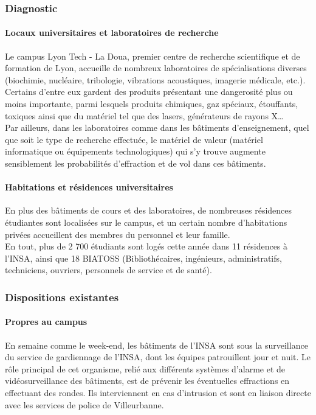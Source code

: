 \documentclass[hidelinks, paper=a4, fontsize=13pt]{report}
\begin{document}
\subsubsection{Diagnostic}
\paragraph{Locaux universitaires et laboratoires de recherche}
Le campus Lyon Tech - La Doua, premier centre de recherche scientifique et de formation de Lyon, accueille de nombreux laboratoires de spécialisations diverses (biochimie, nucléaire, tribologie, vibrations acoustiques, imagerie médicale, etc.). Certains d’entre eux gardent des produits présentant une dangerosité plus ou moins importante, parmi lesquels produits chimiques, gaz spéciaux, étouffants, toxiques ainsi que du matériel tel que des lasers, générateurs de rayons X…\\

Par ailleurs, dans les laboratoires comme dans les bâtiments d’enseignement, quel que soit le type de recherche effectuée, le matériel de valeur (matériel informatique ou équipements technologiques) qui s'y trouve augmente sensiblement les probabilités d’effraction et de vol dans ces bâtiments. 

\paragraph{Habitations et résidences universitaires}
En plus des bâtiments de cours et des laboratoires, de nombreuses résidences étudiantes sont localisées sur le campus, et un certain nombre d’habitations privées accueillent des membres du personnel et leur famille.\\
En tout, plus de 2 700 étudiants sont logés cette année dans 11 résidences à l’INSA, ainsi que 18 BIATOSS (Bibliothécaires, ingénieurs, administratifs, techniciens, ouvriers, personnels de service et de santé).

\subsubsection{Dispositions existantes}
\paragraph{Propres au campus}
En semaine comme le week-end, les bâtiments de l’INSA sont sous la surveillance du service de gardiennage de l’INSA, dont les équipes patrouillent jour et nuit. Le rôle principal de cet organisme, relié aux différents systèmes d’alarme et de vidéosurveillance des bâtiments, est de prévenir les éventuelles effractions en effectuant des rondes. Ils interviennent en cas d’intrusion et sont en liaison directe avec les services de police de Villeurbanne. \\
\end{document}

